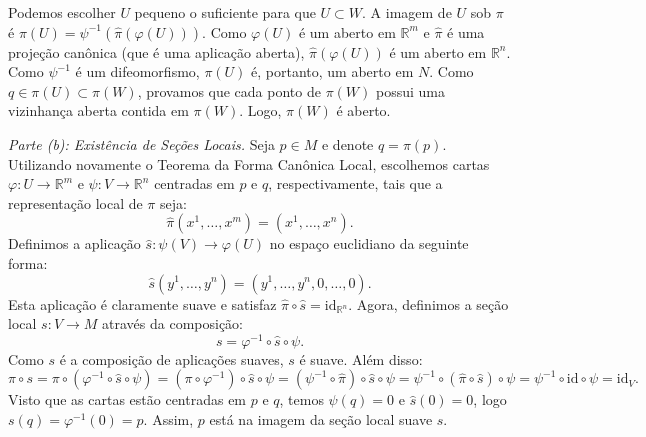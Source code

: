 {	Podemos escolher $U$ pequeno o suficiente para que $U \subset W$. A imagem de $U$ sob $\pi$ é $\pi(U) = \psi^{-1}(\hat{\pi}(\varphi(U)))$. Como $\varphi(U)$ é um aberto em $\mathbb{R}^m$ e $\hat{\pi}$ é uma projeção canônica (que é uma aplicação aberta), $\hat{\pi}(\varphi(U))$ é um aberto em $\mathbb{R}^n$. Como $\psi^{-1}$ é um difeomorfismo, $\pi(U)$ é, portanto, um aberto em $N$.
	Como $q \in \pi(U) \subset \pi(W)$, provamos que cada ponto de $\pi(W)$ possui uma vizinhança aberta contida em $\pi(W)$. Logo, $\pi(W)$ é aberto.
	
	\textit{Parte (b): Existência de Seções Locais.}
	Seja $p \in M$ e denote $q = \pi(p)$. Utilizando novamente o Teorema da Forma Canônica Local, escolhemos cartas $\varphi : U \to \mathbb{R}^m$ e $\psi : V \to \mathbb{R}^n$ centradas em $p$ e $q$, respectivamente, tais que a representação local de $\pi$ seja:
	\begin{equation*}
		\hat{\pi}(x^1, \dots, x^m) = (x^1, \dots, x^n).
	\end{equation*}
	Definimos a aplicação $\hat{s} : \psi(V) \to \varphi(U)$ no espaço euclidiano da seguinte forma:
	\begin{equation*}
		\hat{s}(y^1, \dots, y^n) = (y^1, \dots, y^n, 0, \dots, 0).
	\end{equation*}
	Esta aplicação é claramente suave e satisfaz $\hat{\pi} \circ \hat{s} = \text{id}_{\mathbb{R}^n}$. Agora, definimos a seção local $s : V \to M$ através da composição:
	\begin{equation*}
		s = \varphi^{-1} \circ \hat{s} \circ \psi.
	\end{equation*}
	Como $s$ é a composição de aplicações suaves, $s$ é suave. Além disso:
	\begin{equation*}
		\pi \circ s = \pi \circ (\varphi^{-1} \circ \hat{s} \circ \psi) = (\pi \circ \varphi^{-1}) \circ \hat{s} \circ \psi = (\psi^{-1} \circ \hat{\pi}) \circ \hat{s} \circ \psi = \psi^{-1} \circ (\hat{\pi} \circ \hat{s}) \circ \psi = \psi^{-1} \circ \text{id} \circ \psi = \text{id}_V.
	\end{equation*}
	Visto que as cartas estão centradas em $p$ e $q$, temos $\psi(q) = 0$ e $\hat{s}(0) = 0$, logo $s(q) = \varphi^{-1}(0) = p$. Assim, $p$ está na imagem da seção local suave $s$.
}


